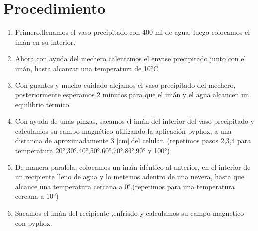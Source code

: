 \section{Procedimiento}
\begin{enumerate}
    \item Primero,llenamos el vaso precipitado con 400 ml de agua, luego colocamos el imán en su interior.
    \item Ahora con ayuda del mechero calentamos el envase precipitado junto con el  imán, hasta alcanzar una temperatura de 10°C
    \item Con guantes y mucho cuidado alejamos el vaso precipitado del mechero, posteriormente esperamos 2 minutos para que el imán y el agua alcancen un equilibrio térmico.
    \item Con ayuda de unas pinzas, sacamos el imán del interior del vaso precipitado y calculamos su campo magnético utilizando la aplicación pyphox, a una distancia de aproximadamente 3 [cm] del celular. (repetimos pasos 2,3,4 para temperatura 20°,30°,40°,50°,60°,70°,80°,90° y 100°)
    \item De manera paralela, colocamos un imán idéntico al anterior, en el interior de un recipiente lleno de agua y lo metemos adentro de una nevera, hasta que alcance una temperatura cercana a 0°.(repetimos para una temperatura cercana a 10°)
    \item Sacamos el imán  del recipiente ,enfriado y calculamos su campo magnetico con pyphox.
\end{enumerate}